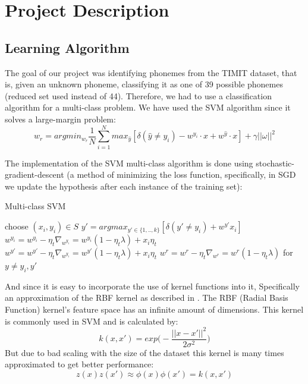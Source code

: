 \documentclass[12pt,a4paper]{article}
\begin{document}
\section{Project Description}
\subsection{Learning Algorithm}
The goal of our project was identifying phonemes from the TIMIT dataset, that is, given an unknown phoneme, classifying it as one of 39 possible phonemes (reduced set used instead of 44). Therefore, we had to use a classification algorithm for a multi-class problem. We have used the SVM algorithm since it solves a large-margin problem:
\begin{equation}
{w_r} = argmin_{w_r}\frac{1}{N}\sum_{i=1}^{N}max_{\widehat{y}}[\delta(\widehat{y} \neq y_i) - w^{y_i} \cdot x + w^{\widehat{y}} \cdot x]+\gamma ||\omega||^2
\end{equation}

The implementation of the SVM multi-class algorithm is done using stochastic-gradient-descent (a method of minimizing the loss function, specifically, in SGD we update the hypothesis after each instance of the training set):

\begin{algorithm}
        \caption{Multi-class SVM}
        \label{mc_svm_alg}
        \begin{algorithmic}[1]
                \State choose $(x_i,y_i) \in S$ 
                \State $y' = argmax_{y'\in \{1,..,k\}} [\delta(y' \ne y_i) + w^{y'}x_i]$
                \State $w^{y_i} = w^{y_i} - \eta_t \nabla_{w^{y_i}} = w^{y_i}(1 - \eta_t \lambda) + x_i \eta_t$
                \State $w^{y'} = w^{y'} - \eta_t \nabla_{w^{y_i}} = w^{y'}(1 - \eta_t \lambda) + x_i \eta_t$
                \State $w^r = w^r - \eta_t \nabla_{w^r} = w^{r}(1 - \eta_t \lambda)$ for $ y \ne y_i,y'$
                \EndIf
                \EndFor
                \EndProcedure
        \end{algorithmic}
\end{algorithm}

And since it is easy to incorporate the use of kernel functions into it, Specifically an approximation of the RBF kernel as described in \cite{Rahimi07randomfeatures}. 
The RBF (Radial Basis Function) kernel's feature space has an infinite amount of dimensions. This kernel is commonly used in SVM and is calculated by:
\begin{equation}
k(x,x') = exp\bigg( -\frac{||x - x'||^2}{2\sigma^2} \bigg)
\end{equation}
But due to bad scaling with the size of the dataset this kernel is many times approximated to get better performance:
\begin{equation}
z(x)z(x') \approx \phi(x)\phi(x') = k(x,x')
\end{equation}
\end{document}
